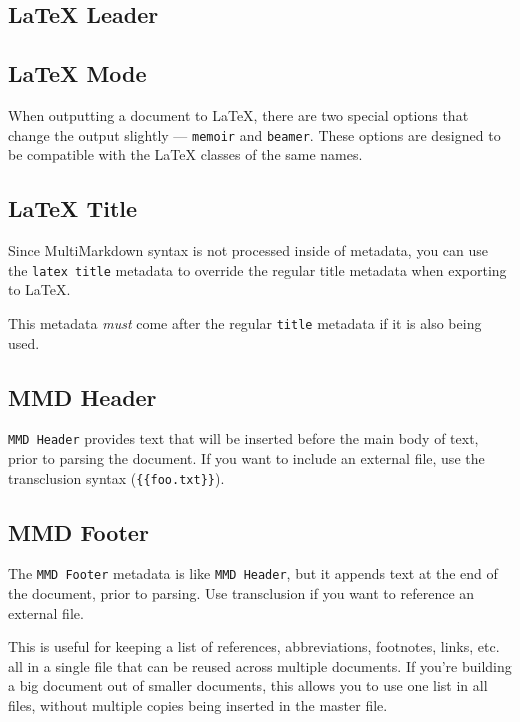 \subsection{LaTeX Leader }
\label{latexleader}

\subsection{LaTeX Mode }
\label{latexmode}

When outputting a document to LaTeX, there are two special options that change
the output slightly --- \texttt{memoir} and \texttt{beamer}. These options are designed to
be compatible with the LaTeX classes of the same names.

\subsection{LaTeX Title }
\label{latextitle}

Since MultiMarkdown syntax is not processed inside of metadata, you can use the \texttt{latex title} metadata to override the regular title metadata when exporting to LaTeX.

This metadata \emph{must} come after the regular \texttt{title} metadata if it is also being used.

\subsection{MMD Header }
\label{mmdheader}

\texttt{MMD Header} provides text that will be inserted before the main body of text, prior to parsing the document. If you want to include an external file, use the transclusion syntax (\texttt{\{\{foo.txt\}\}}).

\subsection{MMD Footer }
\label{mmdfooter}

The \texttt{MMD Footer} metadata is like \texttt{MMD Header}, but it appends text at the end of the document, prior to parsing. Use transclusion if you want to reference an external file.

This is useful for keeping a list of references, abbreviations, footnotes, links, etc. all in a single file that can be reused across multiple documents. If you're building a big document out of smaller documents, this allows you to use one list in all files, without multiple copies being inserted in the master file.

